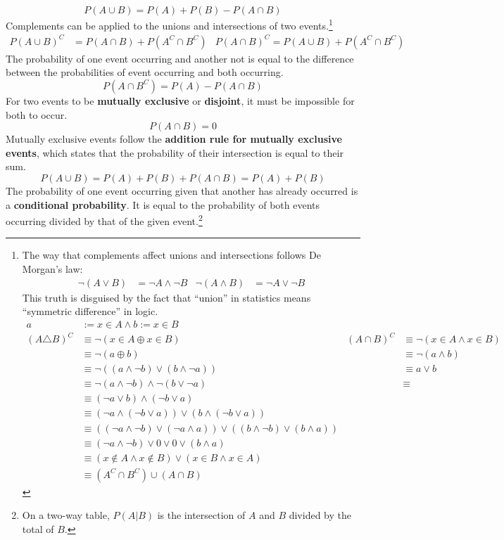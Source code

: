 \documentclass[../AP_Statistics.tex]{subfiles}
\begin{document}
		$$P(A\cup B) = P(A) + P(B) - P(A\cap B)$$
		Complements can be applied to the unions and intersections of two events.\footnote{
			The way that complements affect unions and intersections follows De Morgan's law:\begin{align*}\lnot(A\lor B) &= \lnot A\land\lnot B & \lnot(A\land B) &= \lnot A\lor\lnot B\end{align*}This truth is disguised by the fact that \enquote{union} in statistics means \enquote{symmetric difference} in logic.
			\begin{align*}
				a &:= x\in A \land b:= x\in B \\
				(A\triangle B)^C &\equiv \lnot(x\in A\oplus x\in B) & (A\cap B)^C &\equiv \lnot(x\in A \land x\in B)\\
				&\equiv \lnot(a \oplus b) &&\equiv \lnot(a \land b)\\ 
				&\equiv \lnot((a\land\lnot b)\lor(b\land\lnot a)) &&\equiv a\lor b\\
				&\equiv \lnot(a\land\lnot b)\land\lnot(b\lor\lnot a) &&\equiv \\
				&\equiv (\lnot a \lor b)\land(\lnot b\lor a) \\
				&\equiv (\lnot a \land(\lnot b\lor a)) \lor (b\land(\lnot b\lor a)) \\
				&\equiv ((\lnot a \land \lnot b)\lor (\lnot a \land a)) \lor ((b \land \lnot b) \lor(b\land a)) \\
				&\equiv (\lnot a \land \lnot b) \lor 0 \lor 0 \lor (b\land a) \\
				&\equiv (x\notin A \land x\notin B)\lor(x\in B \land x\in A) \\
				&\equiv (A^C\cap B^C)\cup(A\cap B)
			\end{align*}
		}
		\begin{align*}
			P(A\cup B)^C &= P(A\cap B) + P\left(A^C\cap B^C\right)	& P(A\cap B)^C = P(A\cup B) + P\left(A^C \cap B^C\right)
			\end{align*}
		The probability of one event occurring and another not is equal to the difference between the probabilities of event occurring and both occurring.
		$$P\left(A\cap B^C\right) = P(A) - P(A\cap B)$$
		For two events to be \textbf{mutually exclusive} or \textbf{disjoint}, it must be impossible for both to occur.
		$$P(A\cap B) = 0$$
		Mutually exclusive events follow the \textbf{addition rule for mutually exclusive events}, which states that the probability of their intersection is equal to their sum.
		$$P(A\cup B) = P(A) + P(B) + P(A\cap B) = P(A) + P(B)$$
		The probability of one event occurring given that another has already occurred is a \textbf{conditional probability}. It is equal to the probability of both events occurring divided by that of the given event.\footnote{On a two-way table, $P(A|B)$ is the intersection of $A$ and $B$ divided by the total of $B$.}
\end{document}
